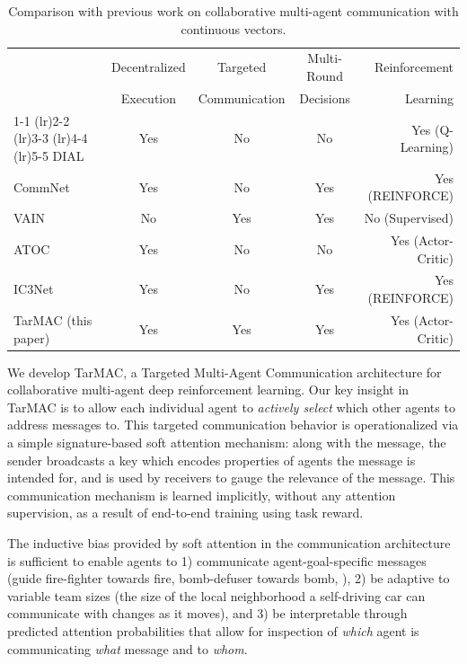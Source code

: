 \begin{table}[t]
    \vspace{-5pt}
    \setlength\tabcolsep{6pt}
    \centering
    \begin{tabular}{@{}l c c c r@{}}
        &  \footnotesize Decentralized  & \footnotesize Targeted & \footnotesize Multi-Round & \footnotesize Reinforcement  \\[-3pt]
        & \footnotesize Execution & \footnotesize  Communication & \footnotesize Decisions & \footnotesize Learning \\
        \cmidrule(r){1-1} \cmidrule(lr){2-2} \cmidrule(lr){3-3} \cmidrule(lr){4-4} \cmidrule(lr){5-5}
        DIAL~\citep{foerster_nips16}
            & Yes & No & No & Yes (Q-Learning) \\
        CommNet~\citep{sukhbaatar_nips16}
            & Yes & No & Yes & Yes (REINFORCE) \\
        VAIN~\citep{hoshen_nips17}
            & No & Yes & Yes & No (Supervised) \\
        ATOC~\citep{jiang_nips18}
            & Yes & No & No & Yes (Actor-Critic) \\
        IC3Net~\citep{singh_iclr19}
            & Yes & No & Yes & Yes (REINFORCE) \\ \midrule
        TarMAC (this paper) & Yes & Yes & Yes & Yes (Actor-Critic) \\ \bottomrule
    \end{tabular}
    \vspace{5pt}
    \caption{Comparison with previous work on collaborative multi-agent communication with continuous vectors.}
    \vspace{-15pt}
    \label{table:related}
\end{table}

We develop TarMAC, a Targeted Multi-Agent Communication
architecture for collaborative multi-agent deep reinforcement learning.
Our key insight in TarMAC is to allow each individual agent to \emph{actively select}
which other agents to address messages to. This targeted communication
behavior is operationalized via a simple signature-based soft attention mechanism: along with the message, the sender broadcasts
a key which encodes properties of agents the message is intended for, and is used by receivers to gauge the relevance of the message.
This communication mechanism is learned implicitly, without any attention supervision,
as a result of end-to-end training using task reward.

The inductive bias provided by soft attention in the communication architecture is sufficient to enable agents to 1) communicate agent-goal-specific messages (\eg guide fire-fighter towards fire, bomb-defuser towards
bomb, \etc), 2) be adaptive to variable team sizes (\eg the size of the local neighborhood a self-driving car can communicate with changes as it moves), and 3) be interpretable through predicted attention probabilities that allow for inspection of \emph{which} agent is communicating \emph{what} message and to \emph{whom}.

